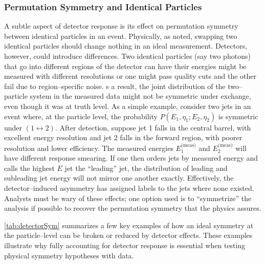         \subsubsection{Permutation Symmetry and Identical Particles}
            A subtle aspect of detector response is its effect on permutation symmetry between identical particles in an event.
            Physically, as noted, swapping two identical particles should change nothing in an ideal measurement.
            Detectors, however, could introduce differences.
            Two identical particles (say two photons) that go into different regions of the detector can have their energies might be measured with different resolutions or one might pass quality cuts and the other fail due to region--specific noise. 
            s a result, the joint distribution of the two--particle system in the measured data might not be symmetric under exchange, even though it was at truth level.
            As a simple example, consider two jets in an event where, at the particle level, the probability $P(E_1, \eta_1; E_2, \eta_2)$ is symmetric under $(1\leftrightarrow 2)$.
            After detection, suppose jet 1 falls in the central barrel, with excellent energy resolution and jet 2 falls in the forward region, with poorer resolution and lower efficiency.
            The measured energies $E_1^\text{(meas)}$ and $E_2^\text{(meas)}$ will have different response smearing.
            If one then orders jets by measured energy and calls the highest $E$ jet the “leading” jet, the distribution of leading and subleading jet energy will not mirror one another exactly.
            Effectively, the detector--induced asymmetry has assigned labels to the jets where none existed.
            Analysts must be wary of these effects;
            one option used is to ``symmetrize'' the analysis if possible to recover the permutation symmetry that the physics assures.

        \cref{tab:detectorSym} summarizes a few key examples of how an ideal symmetry at the particle--level can be broken or reduced by detector effects.
        These examples illustrate why fully accounting for detector response is essential when testing physical symmetry hypotheses with data.
        

